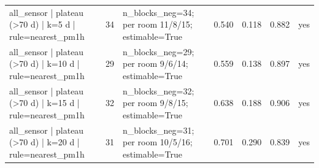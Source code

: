 \begin{tabular}{lllllll}
all\_sensor | plateau (>70 d) | k=5 d | rule=nearest\_pm1h & 34 & n\_blocks\_neg=34; per room 11/8/15; estimable=True & 0.540 & 0.118 & 0.882 & yes \\
all\_sensor | plateau (>70 d) | k=10 d | rule=nearest\_pm1h & 29 & n\_blocks\_neg=29; per room 9/6/14; estimable=True & 0.559 & 0.138 & 0.897 & yes \\
all\_sensor | plateau (>70 d) | k=15 d | rule=nearest\_pm1h & 32 & n\_blocks\_neg=32; per room 9/8/15; estimable=True & 0.638 & 0.188 & 0.906 & yes \\
all\_sensor | plateau (>70 d) | k=20 d | rule=nearest\_pm1h & 31 & n\_blocks\_neg=31; per room 10/5/16; estimable=True & 0.701 & 0.290 & 0.839 & yes \\
\hline
\end{tabular}
